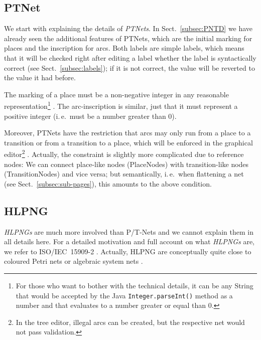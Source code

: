 \subsection{PTNet}
\label{subsec:PTNet}

We start with explaining the details of \emph{PTNets}. In
Sect.~\ref{subsec:PNTD} we have already seen the additional features of 
PTNets, which are the initial marking for
places and the inscription for arcs. Both labels are simple labels, which
means that it will be checked right after editing a label whether the label is
syntactically correct (see Sect.~\ref{subsec:labels}); if it is not
correct, the value will be reverted to the value it had before.

The marking of a place must be a non-negative integer in any reasonable
representation\footnote
 {For those who want to bother with the technical details, it can be any
  String that would be accepted by the Java {\tt Integer.parseInt()}
  method as a number and that evaluates to a number greater or equal than 0.}%
.  The arc-inscription is similar, just that it must represent a positive 
integer (i.\,e.\ must be a number greater than 0).

Moreover, PTNets have the restriction that arcs may only run from a
place to a transition or from a transition to a place, which will
be enforced in the graphical editor\footnote
  {In the tree editor, illegal arcs can be created, but the respective net
   would not pass validation.}%
. Actually, the constraint is slightly more complicated due to
reference nodes: We can connect place-like nodes (PlaceNodes)
with transition-like nodes (TransitionNodes) and vice versa;
but semantically, i.\,e.\ when flattening a net (see
Sect.~\ref{subsec:sub-pages}), this amounts to the above condition.%

\subsection{HLPNG}
\label{subsec:introHLPNG}

\emph{HLPNGs} are much more involved than P/T-Nets and we cannot explain
them in all details here. For a detailed motivation and full account
on what \emph{HLPNGs} are, we refer to ISO/IEC~15909-2
\cite{ISO-IEC:15909-2-2011,HKea09}. Actually, HLPNG are
conceptually quite close to coloured Petri nets \cite{JeKr09} or
algebraic system nets \cite{KiRe96}.

